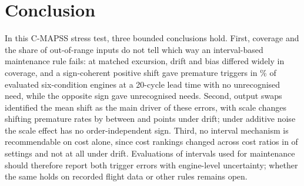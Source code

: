 \section{Conclusion}
In this C-MAPSS stress test, three bounded conclusions hold. First, coverage and the share of out-of-range inputs do not tell which way an interval-based maintenance rule fails: at matched excursion, drift and bias differed widely in coverage, and a sign-coherent positive shift gave premature triggers in \JDriftPremRange\% of evaluated six-condition engines at a 20-cycle lead time with no unrecognised need, while the opposite sign gave unrecognised needs. Second, output swaps identified the mean shift as the main driver of these errors, with scale changes shifting premature rates by between \JSigExtMinPt{} and \JSigExtMaxPt{} points under drift; under additive noise the scale effect has no order-independent sign. Third, no interval mechanism is recommendable on cost alone, since cost rankings changed across cost ratios in \JRevTotal{} of \JRevGroups{} settings and not at all under drift. Evaluations of intervals used for maintenance should therefore report both trigger errors with engine-level uncertainty; whether the same holds on recorded flight data or other rules remains open.
